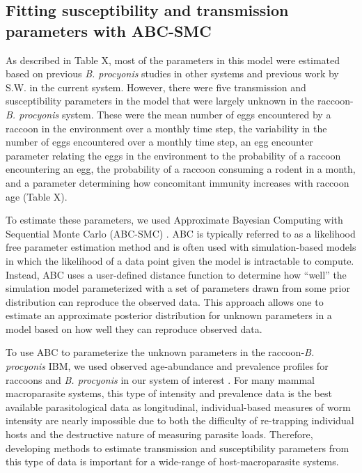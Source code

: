 \documentclass[11pt]{article}
\begin{document}
\subsection{Fitting susceptibility and transmission parameters with ABC-SMC}

As described in Table X, most of the parameters in this model were
estimated based on previous \emph{B. procyonis} studies in other systems
and previous work by S.W. in the current system. However, there were
five transmission and susceptibility parameters in the model that were
largely unknown in the raccoon-\emph{B. procyonis} system. These were
the mean number of eggs encountered by a raccoon in the environment over
a monthly time step, the variability in the number of eggs encountered
over a monthly time step, an egg encounter parameter relating the eggs
in the environment to the probability of a raccoon encountering an egg,
the probability of a raccoon consuming a rodent in a month, and a
parameter determining how concomitant immunity increases with raccoon
age (Table X).

To estimate these parameters, we used Approximate Bayesian Computing
with Sequential Monte Carlo (ABC-SMC) \citep{Sisson2009,Beaumont2010,Kosmala2015}. ABC is typically referred to as a likelihood
free parameter estimation method and is often used with simulation-based
models in which the likelihood of a data point given the model is
intractable to compute. Instead, ABC uses a user-defined distance
function to determine how ``well'' the simulation model parameterized
with a set of parameters drawn from some prior distribution can
reproduce the observed data. This approach allows one to estimate an
approximate posterior distribution for unknown parameters in a model based
on how well they can reproduce observed data.

To use ABC to parameterize the unknown parameters in the
raccoon-\emph{B. procyonis} IBM, we used observed age-abundance and
prevalence profiles for raccoons and \emph{B. procyonis} in our system
of interest \citep{Weinstein2016}. For many mammal macroparasite
systems, this type of intensity and prevalence data is the best
available parasitological data as longitudinal, individual-based
measures of worm intensity are nearly impossible due to both the
difficulty of re-trapping individual hosts and the destructive nature of
measuring parasite loads.
Therefore, developing methods to estimate transmission and
susceptibility parameters from this type of data is important for a
wide-range of host-macroparasite systems.
\end{document}
